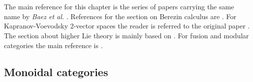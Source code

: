 \chapter{}\label{chapter:hda}

    The main reference for this chapter is the series of papers carrying the same name by \textit{Baez et al.} \cite{HDA5, HDA6}. References for the section on Berezin calculus are \cite{losev_berezin, AMP2}. For Kapranov-Voevodsky 2-vector spaces the reader is referred to the original paper \cite{kapranov_voevodsky}. The section about higher Lie theory is mainly based on \cite{bv_formalism}. For fusion and modular categories the main reference is \cite{etingof}.

\section{Monoidal categories}\label{section:monoidal_categories}

